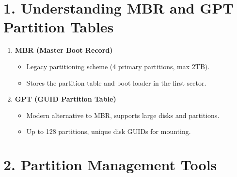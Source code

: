 \documentclass[a4paper]{report}
\begin{document}
\section*{1. Understanding MBR and GPT Partition Tables}
\begin{enumerate}

    \item \textbf{MBR (Master Boot Record)}
\begin{itemize}
    \item Legacy partitioning scheme (4 primary partitions, max 2TB).
    \item Stores the partition table and boot loader in the first sector.
\end{itemize}

\item \textbf{GPT (GUID Partition Table)}
\begin{itemize}
    \item Modern alternative to MBR, supports large disks and partitions.
    \item Up to 128 partitions, unique disk GUIDs for mounting.
\end{itemize}
\end{enumerate}

\section*{2. Partition Management Tools}
\end{document}
